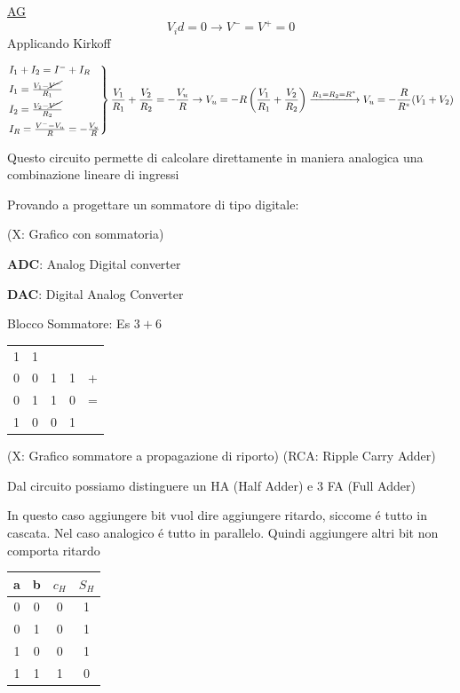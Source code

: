 \documentclass{article}
\begin{document}
\underline{AG}
\[ V_id = 0 \rightarrow V^- = V^+ = 0\]
Applicando Kirkoff

\[ \begin{rcases}
        I_1 + I_2 = I^- + I_R\\
        I_1 = \frac{V_1 - \cancel{V^-}}{R_1} \\
        I_2 = \frac{V_2 - \cancel{V^-}}{R_2} \\
        I_R = \frac{V^- - V_u}{R} = -\frac{V_u}{R}\\
    \end{rcases}
    \frac{V_1}{R_1} + \frac{V_2}{R_2} = -\frac{V_u}{R} \rightarrow V_u = -R\left( \frac{V_1}{R_1} + \frac{V_2}{R_2}\right)  \xrightarrow{R_1 = R_2 = R^*} V_u = -\frac{R}{R^*}(V_1 + V_2)
\]

Questo circuito permette di calcolare direttamente in maniera analogica una combinazione lineare di ingressi

Provando a progettare un sommatore di tipo digitale:

(X: Grafico con sommatoria)

\textbf{ADC}: Analog Digital converter

\textbf{DAC}: Digital Analog Converter

Blocco Sommatore: Es $3+6$

\begin{tabular}{c c c c c}
    1 & 1 & \\
    0 & 0 & 1 & 1 & + \\
    0 & 1 & 1 & 0 & = \\
    \hline
    1 & 0 & 0 & 1
\end{tabular}

(X: Grafico sommatore a propagazione di riporto)
(RCA: Ripple Carry Adder)

Dal circuito possiamo distinguere un HA (Half Adder) e 3 FA (Full Adder)

In questo caso aggiungere bit vuol dire aggiungere ritardo, siccome \'e tutto in cascata. Nel caso analogico \'e tutto in parallelo. Quindi aggiungere altri bit non comporta ritardo

\begin{tabular}{c c|c c}
    a & b & $c_H$ & $S_H$\\
    \hline
    0 & 0 & 0 & 1 \\
    0 & 1 & 0 & 1 \\
    1 & 0 & 0 & 1 \\
    1 & 1 & 1 & 0
\end{tabular}
\end{document}
